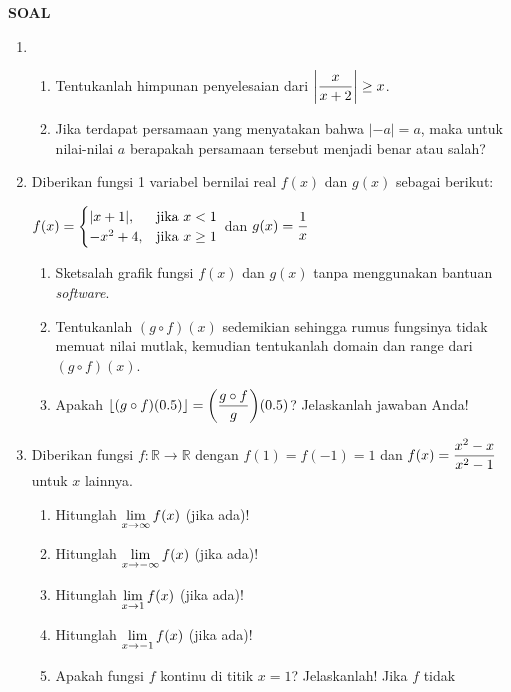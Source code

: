 \begin{center}
\textbf{\large{SOAL}}
\end{center}
\begin{enumerate}[leftmargin=*, label={\arabic*}.]
\item 
    \begin{enumerate}[label={\alph*}.]
    \item Tentukanlah himpunan penyelesaian dari 
    $\ds \abs*{\frac{x}{x+2}} \geq x$.
    \item Jika terdapat persamaan yang menyatakan bahwa $|-a| = a$, 
    maka untuk nilai-nilai $a$ berapakah persamaan tersebut menjadi 
    benar atau salah?
    \end{enumerate}
\item Diberikan fungsi 1 variabel bernilai real $f(x)$ dan $g(x)$ sebagai berikut:
\begin{center}
    $\ds f(x) = 
    \begin{cases}
        \abs{x+1}, &\text{jika $x < 1$}\\
        -x^{2}+4, &\text{jika $x \geq 1$}
    \end{cases}$ dan $\ds g(x) = \frac{1}{x}$
\end{center}
    \begin{enumerate}[label={\alph*}.]
    \item Sketsalah grafik fungsi $f(x)$ dan $g(x)$ tanpa menggunakan bantuan
    \textit{software}.    
    \item Tentukanlah $(g \circ f)(x)$ sedemikian sehingga rumus fungsinya tidak 
    memuat nilai mutlak, kemudian tentukanlah domain dan range dari $(g \circ f)(x)$.
    \item Apakah 
    $\ds \floor*{(g \circ f)(0.5)} = \brk*{\frac{g \circ f}{g}}(0.5)$? 
    Jelaskanlah jawaban Anda!
    \end{enumerate}
\item Diberikan fungsi $f\colon \mathbb{R} \to \mathbb{R}$ dengan $f(1)=f(-1)=1$ 
dan $\ds f(x) = \frac{x^{2}-x}{x^{2}-1}$ untuk $x$ lainnya.
    \begin{enumerate}[label={\alph*}.]
    \item Hitunglah $\ds \lim_{x \to \infty} f(x)$ (jika ada)! 
    \item Hitunglah $\ds \lim_{x \to -\infty} f(x)$ (jika ada)! 
    \item Hitunglah $\ds \lim_{x \to 1} f(x)$ (jika ada)! 
    \item Hitunglah $\ds \lim_{x \to -1} f(x)$ (jika ada)!
    \item Apakah fungsi $f$ kontinu di titik $x=1$? Jelaskanlah! Jika $f$ tidak 

\end{enumerate}
\end{enumerate}
